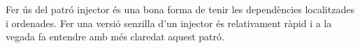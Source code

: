 

Fer ús del patró injector és una bona forma de tenir les dependències localitzades
i ordenades. Fer una versió senzilla d'un injector és relativament ràpid i a la 
vegada fa entendre amb més claredat aquest patró. 


